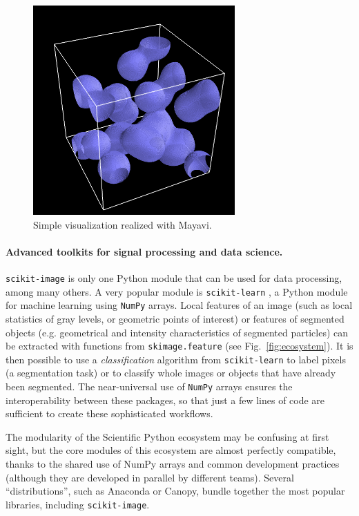\documentclass[twocolumn]{bmcart}%
\begin{document}
\begin{figure}[ht!]
    \centerline{\includegraphics[width=0.6\columnwidth]{mayavi_example}}
    \caption{Simple visualization realized with Mayavi.
 \label{fig:mayavi}}
\end{figure}



\paragraph{Advanced toolkits for signal processing and data science.}

\texttt{scikit-image} is only one Python module that can be used for data
processing, among many others. A very popular module is
\texttt{scikit-learn} \citep{Pedregosa2011}, a Python module for machine
learning using \texttt{NumPy} arrays. Local features of an image
(such as local statistics of gray levels, or geometric points of
interest) or features of segmented objects (e.g. geometrical and
intensity characteristics of segmented particles) can be extracted with
functions from \texttt{skimage.feature} (see Fig.~\ref{fig:ecosystem}). It
is then possible to use a \emph{classification} algorithm from
\texttt{scikit-learn} to label pixels (a segmentation task)
or to classify whole images or objects that have already been segmented.
The near-universal use of \texttt{NumPy} arrays ensures the interoperability
between these packages, so that just a few lines of code are sufficient
to create these sophisticated workflows.

The modularity of the Scientific Python ecosystem may be
confusing at first sight, but the core modules of this ecosystem
are almost perfectly compatible, thanks to the shared use of NumPy arrays
and common development practices (although they are developed in parallel
by different teams). Several ``distributions'', such as Anaconda
or Canopy, bundle together the most popular libraries, including
\texttt{scikit-image}.
\end{document}
